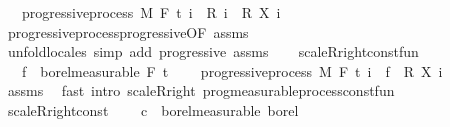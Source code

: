 \begin{isabellebody}
\ \ \ {\isachardoublequoteopen}progressive{\isacharunderscore}{\kern0pt}process\ M\ F\ t\ {\isacharparenleft}{\kern0pt}{\isasymlambda}i\ {\isasymxi}{\isachardot}{\kern0pt}\ {\isacharparenleft}{\kern0pt}R\ i\ {\isasymxi}{\isacharparenright}{\kern0pt}\ {\isacharasterisk}{\kern0pt}\isactrlsub R\ {\isacharparenleft}{\kern0pt}X\ i\ {\isasymxi}{\isacharparenright}{\kern0pt}{\isacharparenright}{\kern0pt}{\isachardoublequoteclose}\isanewline
%
\isadelimproof
\ \ %
\endisadelimproof
%
\isatagproof
{}\isamarkupfalse%
\ progressive{\isacharunderscore}{\kern0pt}process{\isachardot}{\kern0pt}progressive{\isacharbrackleft}{\kern0pt}OF\ assms{\isacharbrackright}{\kern0pt}\ \isamarkupfalse%
\ {\isacharparenleft}{\kern0pt}unfold{\isacharunderscore}{\kern0pt}locales{\isacharparenright}{\kern0pt}\ {\isacharparenleft}{\kern0pt}simp\ add{\isacharcolon}{\kern0pt}\ progressive\ assms{\isacharparenright}{\kern0pt}%
\endisatagproof
{\isafoldproof}%
%
\isadelimproof
\isanewline
%
\endisadelimproof
\ \ \isanewline
{}\isamarkupfalse%
\ scaleR{\isacharunderscore}{\kern0pt}right{\isacharunderscore}{\kern0pt}const{\isacharunderscore}{\kern0pt}fun{\isacharcolon}{\kern0pt}\ \isanewline
\ \ \ {\isachardoublequoteopen}f\ {\isasymin}\ borel{\isacharunderscore}{\kern0pt}measurable\ {\isacharparenleft}{\kern0pt}F\ t\ \isanewline
\ \ \ {\isachardoublequoteopen}progressive{\isacharunderscore}{\kern0pt}process\ M\ F\ t\ {\isacharparenleft}{\kern0pt}{\isasymlambda}i\ {\isasymxi}{\isachardot}{\kern0pt}\ f\ {\isasymxi}\ {\isacharasterisk}{\kern0pt}\isactrlsub R\ {\isacharparenleft}{\kern0pt}X\ i\ {\isasymxi}{\isacharparenright}{\kern0pt}{\isacharparenright}{\kern0pt}{\isachardoublequoteclose}\isanewline
%
\isadelimproof
\ \ %
\endisadelimproof
%
\isatagproof
{}\isamarkupfalse%
\ assms\ \isamarkupfalse%
\ {\isacharparenleft}{\kern0pt}fast\ intro{\isacharcolon}{\kern0pt}\ scaleR{\isacharunderscore}{\kern0pt}right\ prog{\isacharunderscore}{\kern0pt}measurable{\isacharunderscore}{\kern0pt}process{\isacharunderscore}{\kern0pt}const{\isacharunderscore}{\kern0pt}fun{\isacharparenright}{\kern0pt}%
\endisatagproof
{\isafoldproof}%
%
\isadelimproof
\isanewline
%
\endisadelimproof
\isanewline
{}\isamarkupfalse%
\ scaleR{\isacharunderscore}{\kern0pt}right{\isacharunderscore}{\kern0pt}const{\isacharcolon}{\kern0pt}\ \isanewline
\ \ \ {\isachardoublequoteopen}c\ {\isasymin}\ borel{\isacharunderscore}{\kern0pt}measurable\ borel{\isachardoublequoteclose}\isanewline

\end{isabellebody}
